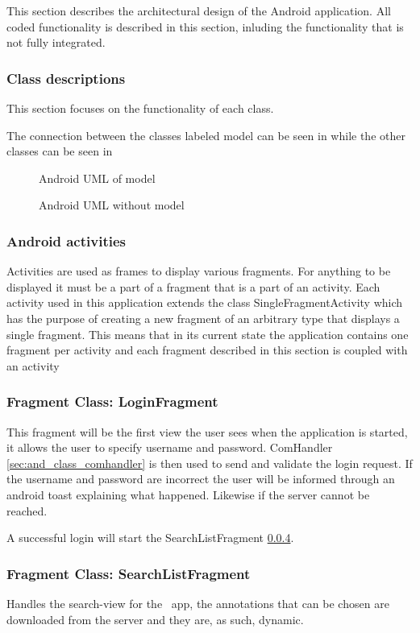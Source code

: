 This section describes the architectural design of the Android application. All coded functionality is described in this section, inluding the functionality that is not fully integrated. 
\subsubsection{Class descriptions}\label{sec:and_classdescription}
This section focuses on the functionality of each class.

The connection between the classes labeled model can be seen in  while the other classes can be seen in 
	\begin{figure}[h]
		\caption{Android UML of model}
		\label{fig:and_umlmodel}
	\end{figure}  
\begin{figure}[h]	
		\caption{Android UML without model}
		\label{fig:and_uml}
	\end{figure}  
    \FloatBarrier
\subsubsection{Android activities} 
Activities are used as frames to display various fragments. For anything to be displayed it must be a part of a fragment that is a part of an activity. Each activity used in this application extends the class SingleFragmentActivity which has the purpose of creating a new fragment of an arbitrary type that displays a single fragment. This means that in its current state the application contains one fragment per activity and each fragment described in this section is coupled with an activity
\subsubsection{Fragment Class: LoginFragment}
This fragment will be the first view the user sees when the application is started, it allows the user to specify username and password. ComHandler \ref{sec:and_class_comhandler} is then used to send and validate the login request. If the username and password are incorrect the user will be informed through an android toast explaining what happened. Likewise if the server cannot be reached.

A successful login will start the SearchListFragment \ref{sec:and_class_search}.
\subsubsection{Fragment Class: SearchListFragment}\label{sec:and_class_search}
Handles the search-view for the \appName\ app, the annotations that can be chosen are downloaded from the server and they are, as such, dynamic.
